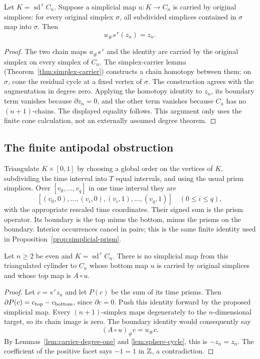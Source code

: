 \begin{lemma}\label{lem:carrier-degree-one}
Let $K=\operatorname{sd}^{\,r}C_n$. Suppose a simplicial map $u:K\to C_n$ is carried by original simplices: for every original simplex $\sigma$, all subdivided simplices contained in $\sigma$ map into $\sigma$. Then
\[
 u_\#s^{\,r}(z_n)=z_n.
\]
\end{lemma}
\begin{proof}
The two chain maps $u_\#s^{\,r}$ and the identity are carried by the original simplex on every simplex of $C_n$. The simplex-carrier lemma (Theorem~\ref{thm:simplex-carrier}) constructs a chain homotopy between them: on $\sigma$, cone the residual cycle at a fixed vertex of $\sigma$. The construction agrees with the augmentation in degree zero. Applying the homotopy identity to $z_n$, its boundary term vanishes because $\partial z_n=0$, and the other term vanishes because $C_n$ has no $(n+1)$-chains. The displayed equality follows. This argument only uses the finite cone calculation, not an externally assumed degree theorem.
\end{proof}

\subsection{The finite antipodal obstruction}

Triangulate $K\times[0,1]$ by choosing a global order on the vertices of $K$, subdividing the time interval into $T$ equal intervals, and using the usual prism simplices. Over $[v_0,\ldots,v_q]$ in one time interval they are
\[
[(v_0,0),\ldots,(v_i,0),(v_i,1),\ldots,(v_q,1)]
 \quad(0\leq i\leq q),
\]
with the appropriate rescaled time coordinates. Their signed sum is the prism operator. Its boundary is the top minus the bottom, minus the prisms on the boundary. Interior occurrences cancel in pairs; this is the same finite identity used in Proposition~\ref{prop:simplicial-prism}.

\begin{theorem}\label{thm:antipodal-finite}
Let $n\geq2$ be even and $K=\operatorname{sd}^{\,r}C_n$.
There is no simplicial map from this triangulated cylinder to $C_n$ whose bottom map $u$ is carried by original simplices and whose top map is $A\circ u$.
\end{theorem}
\begin{proof}
Let $c=s^{\,r}z_n$ and let $P(c)$ be the sum of its time prisms. Then
$\partial P(c)=c_{\rm top}-c_{\rm bottom}$, since $\partial c=0$. Push this identity forward by the proposed simplicial map. Every $(n+1)$-simplex maps degenerately to the $n$-dimensional target, so its chain image is zero. The boundary identity would consequently say
\[
 (A\circ u)_\#c=u_\#c.
\]
By Lemmas~\ref{lem:carrier-degree-one} and \ref{lem:sphere-cycle}, this is $-z_n=z_n$. The coefficient of the positive facet says $-1=1$ in $\mathbb Z$, a contradiction.
\end{proof}

